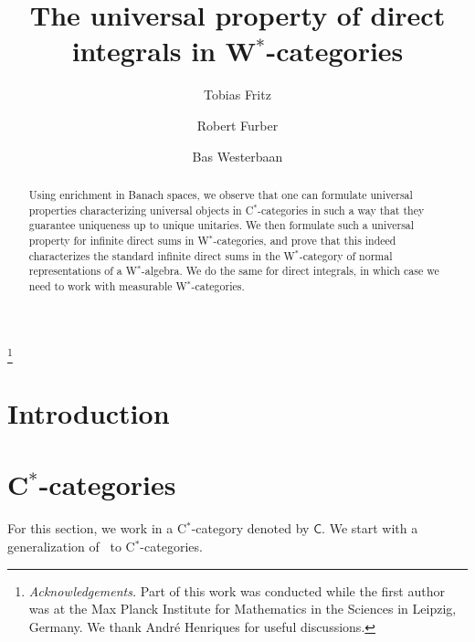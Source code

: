 \documentclass[reqno,T1]{amsproc}
\newcommand{\cat}[1]{\mathsf{#1}}		%
\theoremstyle{plain}
\theoremstyle{remark}
\numberwithin{equation}{section}
\begin{document}
\sloppy

\setlength{\jot}{6pt}



\title{The universal property of direct integrals in W$^*$-categories}

\author{Tobias Fritz}
\author{Robert Furber}
\author{Bas Westerbaan}

\address{Perimeter Institute for Theoeretical Physics}

\address{add your affiliation here}

\keywords{}


\thanks{\textit{Acknowledgements.} Part of this work was conducted while the first author was at the Max Planck Institute for Mathematics in the Sciences in Leipzig, Germany. We thank Andr\'e{} Henriques for useful discussions.}

\begin{abstract}
Using enrichment in Banach spaces, we observe that one can formulate universal properties characterizing universal objects in C$^*$-categories in such a way that they guarantee uniqueness up to unique unitaries. We then formulate such a universal property for infinite direct sums in W$^*$-categories, and prove that this indeed characterizes the standard infinite direct sums in the W$^*$-category of normal representations of a W$^*$-algebra. We do the same for direct integrals, in which case we need to work with measurable W$^*$-categories.
\end{abstract}

\maketitle

\section{Introduction}


\section{C$^*$-categories}

For this section, we work in a C$^*$-category \cite{wstarcat} denoted by $\cat{C}$.
We start with a generalization of~\cite[Lemma 7]{westerbaan2016universal}
    to C$^*$-categories.
\end{document}
